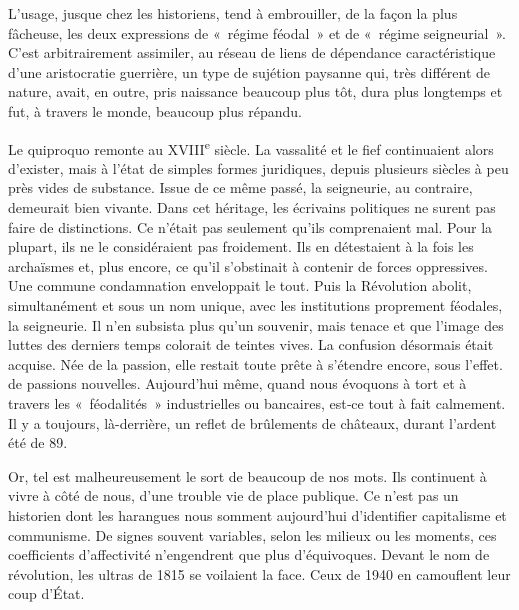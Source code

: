\documentclass[french,twoside]{book} %
\newcommand{\astermono}{\medskip\centerline{\color{rubric}\large\selectfont{\syms ✻}}\medskip\par}%
\begin{document}
L’usage, jusque chez les historiens, tend à embrouiller, de la façon la plus fâcheuse, les deux expressions de « régime féodal » et de « régime seigneurial ». C’est arbitrairement assimiler, au réseau de liens de dépen­dance caractéristique d’une aristocratie guerrière, un type de sujétion paysanne qui, très différent de nature, avait, en outre, pris naissance beaucoup plus tôt, dura plus longtemps et fut, à travers le monde, beau­coup plus répandu.\par
Le quiproquo remonte au XVIII\textsuperscript{e} siècle. La vassalité et le fief conti­nuaient alors d’exister, mais à l’état de simples formes juridiques, depuis plusieurs siècles à peu près vides de substance. Issue de ce même passé, la seigneurie, au contraire, demeurait bien vivante. Dans cet héritage, les écrivains politiques ne surent pas faire de distinctions. Ce n’était pas seulement qu’ils comprenaient mal. Pour la plupart, ils ne le considé­raient pas froidement. Ils en détestaient à la fois les archaïsmes et, plus encore, ce qu’il s’obstinait à contenir de forces oppressives. Une com­mune condamnation enveloppait le tout. Puis la Révolution abolit, simul­tanément et sous un nom unique, avec les institutions proprement féodales, la seigneurie. Il n’en subsista plus qu’un souvenir, mais tenace et que l’image des luttes des derniers temps colorait de teintes vives. La confusion désormais était acquise. Née de la passion, elle res­tait toute prête à s’étendre encore, sous l’effet. de passions nouvelles. Aujourd’hui même, quand nous évoquons à tort et à travers les « féo­dalités » industrielles ou bancaires, est‑ce tout à fait calmement. Il y a toujours, là-derrière, un reflet de brûlements de châteaux, durant l’ardent été de 89.\par
Or, tel est malheureusement le sort de beaucoup de nos mots. Ils con­tinuent à vivre à côté de nous, d’une trouble vie de place publique. Ce n’est pas un historien dont les harangues nous somment aujourd’hui d’identifier capitalisme et communisme. De signes souvent variables, selon les milieux ou les moments, ces coefficients d’affectivité n’engen­drent que plus d’équivoques. Devant le nom de révolution, les ultras de 1815 se voilaient la face. Ceux de 1940 en camouflent leur coup d’État.\par

\astermono
\end{document}
